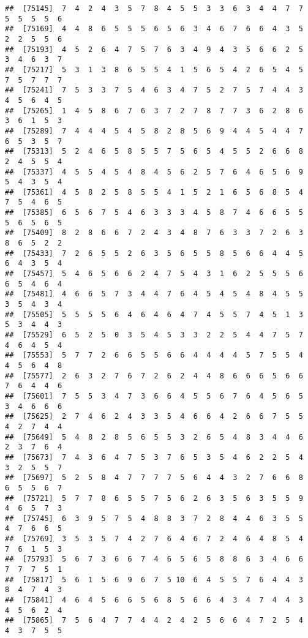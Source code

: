 \documentclass[
]{book}
\begin{document}
\begin{verbatim}
##  [75145]  7  4  2  4  3  5  7  8  4  5  5  3  3  6  3  4  4  7  7  5  5  5  5  6
##  [75169]  4  4  8  6  5  5  5  6  5  6  3  4  6  7  6  6  4  3  5  2  2  5  5  6
##  [75193]  4  5  2  6  4  7  5  7  6  3  4  9  4  3  5  6  6  2  5  3  4  6  3  7
##  [75217]  5  3  1  3  8  6  5  5  4  1  5  6  5  4  2  6  5  4  5  7  5  7  7  7
##  [75241]  7  5  3  3  7  5  4  6  3  4  7  5  2  7  5  7  4  4  3  4  5  6  4  5
##  [75265]  1  4  5  8  6  7  6  3  7  2  7  8  7  7  3  6  2  8  6  3  6  1  5  3
##  [75289]  7  4  4  4  5  4  5  8  2  8  5  6  9  4  4  5  4  4  7  6  5  3  5  7
##  [75313]  5  2  4  6  5  8  5  5  7  5  6  5  4  5  5  2  6  6  8  2  4  5  5  4
##  [75337]  4  5  5  4  5  4  8  4  5  6  2  5  7  6  4  6  5  6  9  5  4  3  5  4
##  [75361]  4  5  8  2  5  8  5  5  4  1  5  2  1  6  5  6  8  5  4  7  5  4  6  5
##  [75385]  6  5  6  7  5  4  6  3  3  3  4  5  8  7  4  6  6  5  5  5  6  5  6  5
##  [75409]  8  2  8  6  6  7  2  4  3  4  8  7  6  3  3  7  2  6  3  8  6  5  2  2
##  [75433]  7  2  6  5  5  2  6  3  5  6  5  5  8  5  6  6  4  4  5  6  4  3  5  4
##  [75457]  5  4  6  5  6  6  2  4  7  5  4  3  1  6  2  5  5  5  6  6  5  4  6  4
##  [75481]  4  6  6  5  7  3  4  4  7  6  4  5  4  5  4  8  4  5  5  3  5  4  3  4
##  [75505]  5  5  5  5  6  4  6  4  6  4  7  4  5  5  7  4  5  1  3  5  3  4  4  3
##  [75529]  6  5  2  5  0  3  5  4  5  3  3  2  2  5  4  4  7  5  7  4  6  4  5  4
##  [75553]  5  7  7  2  6  6  5  5  6  6  4  4  4  4  5  7  5  5  4  4  5  6  4  8
##  [75577]  2  6  3  2  7  6  7  2  6  2  4  4  8  6  6  6  5  6  6  7  6  4  4  6
##  [75601]  7  5  5  3  4  7  3  6  6  4  5  5  6  7  6  4  5  6  5  3  4  6  6  6
##  [75625]  2  7  4  6  2  4  3  3  5  4  6  6  4  2  6  6  7  5  5  4  2  7  4  4
##  [75649]  5  4  8  2  8  5  6  5  5  3  2  6  5  4  8  3  4  4  6  2  3  7  6  4
##  [75673]  7  4  3  6  4  7  5  3  7  6  5  3  5  4  6  2  2  5  4  3  2  5  5  7
##  [75697]  5  2  5  8  4  7  7  7  7  5  6  4  4  3  2  7  6  6  8  6  5  5  6  7
##  [75721]  5  7  7  8  6  5  5  7  5  6  2  6  3  5  6  3  5  5  9  4  6  5  7  3
##  [75745]  6  3  9  5  7  5  4  8  8  3  7  2  8  4  4  6  3  5  5  4  7  6  6  5
##  [75769]  3  5  3  5  7  4  2  7  6  4  6  7  2  4  6  4  8  5  4  7  6  1  5  3
##  [75793]  5  6  7  3  6  6  7  4  6  5  6  5  8  8  6  3  4  6  6  7  7  7  5  1
##  [75817]  5  6  1  5  6  9  6  7  5 10  6  4  5  5  7  6  4  4  3  8  4  7  4  3
##  [75841]  4  6  4  5  6  6  5  6  8  5  6  6  4  3  4  7  4  4  3  4  5  6  2  4
##  [75865]  7  5  6  4  7  7  4  4  2  4  2  5  6  6  4  7  2  5  4  4  3  7  5  5

\end{verbatim}
\end{document}
